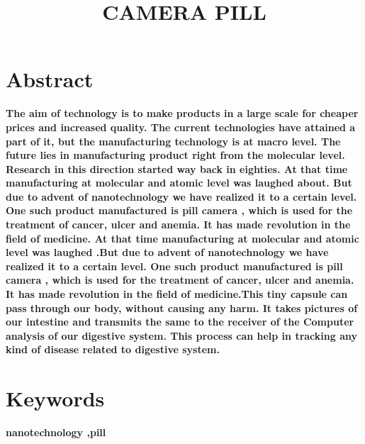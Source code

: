 \documentclass{article}
\title{CAMERA PILL}
\begin{document}
\date{\vspace{-5ex}}

\maketitle

\section*{Abstract}
\textbf{The aim of technology is to make products in a large scale for cheaper prices and increased quality. The current technologies have attained a part of it, but the manufacturing technology is at macro level. The future lies in manufacturing product right from the molecular level. Research in this direction started way back in eighties. At that time manufacturing at molecular and atomic level was laughed about. But due to advent of nanotechnology we have realized it to a certain level. One such product manufactured is pill camera , which is used for the treatment of cancer, ulcer and anemia. It has made revolution in the field of medicine. At that time manufacturing at molecular and atomic level was laughed .But due to advent of nanotechnology we have realized it to a certain level. One such product manufactured is pill camera , which is used for the treatment of cancer, ulcer and anemia. It has made revolution in the field of medicine.This tiny capsule can pass through our body, without causing any harm. It takes pictures of our intestine and transmits the same to the receiver of the Computer analysis of our digestive system. This process can help in tracking any kind of disease related to digestive system.
}
\section*{Keywords}
\textbf{nanotechnology ,pill}
\end{document}
